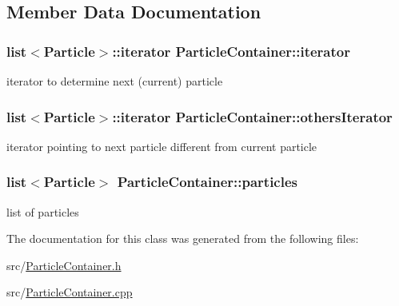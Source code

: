 \subsection{Member Data Documentation}
\hypertarget{classParticleContainer_a95197b7951a740a84c988c6981f90eb9}{
\subsubsection[{iterator}]{\setlength{\rightskip}{0pt plus 5cm}list$<${\bf Particle}$>$\+::iterator Particle\+Container\+::iterator\hspace{0.3cm}{\ttfamily [private]}}}\label{classParticleContainer_a95197b7951a740a84c988c6981f90eb9}
iterator to determine next (current) particle \hypertarget{classParticleContainer_a1468b3eecb365425a476eb6b81e99857}{
\subsubsection[{others\+Iterator}]{\setlength{\rightskip}{0pt plus 5cm}list$<${\bf Particle}$>$\+::{\bf iterator} Particle\+Container\+::others\+Iterator\hspace{0.3cm}{\ttfamily [private]}}}\label{classParticleContainer_a1468b3eecb365425a476eb6b81e99857}
iterator pointing to next particle different from current particle \hypertarget{classParticleContainer_a2a64265094e9b6d7731d9e86b56e950a}{
\subsubsection[{particles}]{\setlength{\rightskip}{0pt plus 5cm}list$<${\bf Particle}$>$ Particle\+Container\+::particles\hspace{0.3cm}{\ttfamily [private]}}}\label{classParticleContainer_a2a64265094e9b6d7731d9e86b56e950a}
list of particles 

The documentation for this class was generated from the following files\+:\begin{DoxyCompactItemize}
\item 
src/\hyperlink{ParticleContainer_8h}{Particle\+Container.\+h}\item 
src/\hyperlink{ParticleContainer_8cpp}{Particle\+Container.\+cpp}\end{DoxyCompactItemize}
